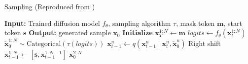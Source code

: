 
\begin{algorithm}[H]
\footnotesize
\caption{Sampling (Reproduced from \cite{gong_scaling_2025})}
\label{alg:sampling}
\begin{algorithmic}[1]
\State \textbf{Input:} Trained diffusion model $f_{\theta}$, sampling algorithm $\tau$, mask token $\bm{m}$, start token $\bm{s}$
\State \textbf{Output:} generated sample $\bm{x}_0$
\State \textbf{Initialize} $\bm{x}_T^{1:N} \gets \bm{m}$
    \State $\textit{logits} \gets f_{\theta}(\bm{x}_{t}^{1:N})$
    \State $\tilde{\bm{x}}_0^{1:N} \sim \text{Categorical}(\tau(\textit{logits}))$
        \State $\bm{x}_{t-1}^n \gets q(\bm{x}_{t-1}^n \mid \bm{x}_t^n, \tilde{\bm{x}}_0^n)$ 
    \EndFor
    \State Right shift $\bm{x}_{t-1}^{1:N} \gets [\bm{s}, \bm{x}_{t-1}^{1:N-1}]$ \label{algo:line-sample-shift}
\EndFor
\State \Return $\bm{x}_0^{2:N}$
\end{algorithmic}
\end{algorithm}

